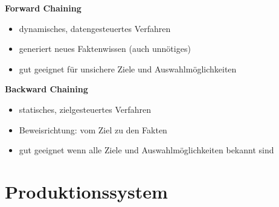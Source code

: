 \documentclass[12pt]{article}
\begin{document}
\textbf{Forward Chaining}
\begin{itemize}
\item dynamisches, datengesteuertes Verfahren
\item generiert neues Faktenwissen (auch unnötiges)
\item gut geeignet für unsichere Ziele und Auswahlmöglichkeiten
\end{itemize}
\textbf{Backward Chaining}
\begin{itemize}
\item statisches, zielgesteuertes Verfahren
\item Beweisrichtung: vom Ziel zu den Fakten
\item gut geeignet wenn alle Ziele und Auswahlmöglichkeiten bekannt sind
\end{itemize}

\section{Produktionssystem}
\end{document}
